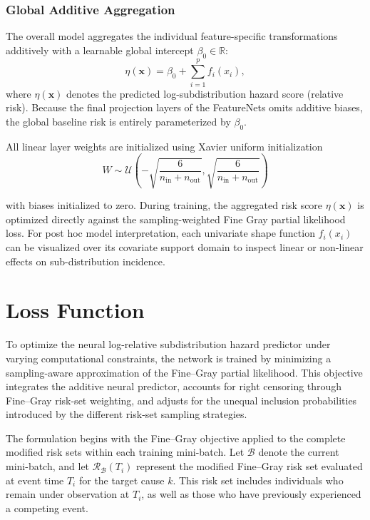 \documentclass[a4paper,twoside,12pt]{report}
\begin{document}
\subsubsection{Global Additive Aggregation}
The overall model aggregates the individual feature-specific transformations additively with a learnable global intercept $\beta_0 \in \mathbb{R}$:
\begin{equation}
    \eta(\mathbf{x}) = \beta_0 + \sum_{i=1}^p f_i(x_i),
\end{equation}
where $\eta(\mathbf{x})$ denotes the predicted log-subdistribution hazard score (relative risk). Because the final projection layers of the FeatureNets omits additive biases, the global baseline risk is entirely parameterized by $\beta_0$.

All linear layer weights are initialized using Xavier uniform initialization 
\begin{equation}
    W \sim \mathcal{U}\left(-\sqrt{\frac{6}{n_{\text{in}} + n_{\text{out}}}}, \sqrt{\frac{6}{n_{\text{in}} + n_{\text{out}}}}\right)
\end{equation}

with biases initialized to zero. During training, the aggregated risk score $\eta(\mathbf{x})$ is optimized directly against the sampling-weighted Fine Gray partial likelihood loss. For post hoc model interpretation, each univariate shape function $f_i(x_i)$ can be visualized over its covariate support domain to inspect linear or non-linear effects on sub-distribution incidence.


\section{Loss Function}

To optimize the neural log-relative subdistribution hazard predictor under varying computational constraints, the network is trained by minimizing a sampling-aware approximation of the Fine--Gray partial likelihood. This objective integrates the additive neural predictor, accounts for right censoring through Fine--Gray risk-set weighting, and adjusts for the unequal inclusion probabilities introduced by the different risk-set sampling strategies.

The formulation begins with the Fine--Gray objective applied to the complete modified risk sets within each training mini-batch. Let $\mathcal{B}$ denote the current mini-batch, and let $\mathcal{R}_{\mathcal{B}}(T_i)$ represent the modified Fine--Gray risk set evaluated at event time $T_i$ for the target cause $k$. This risk set includes individuals who remain under observation at $T_i$, as well as those who have previously experienced a competing event.
\end{document}
